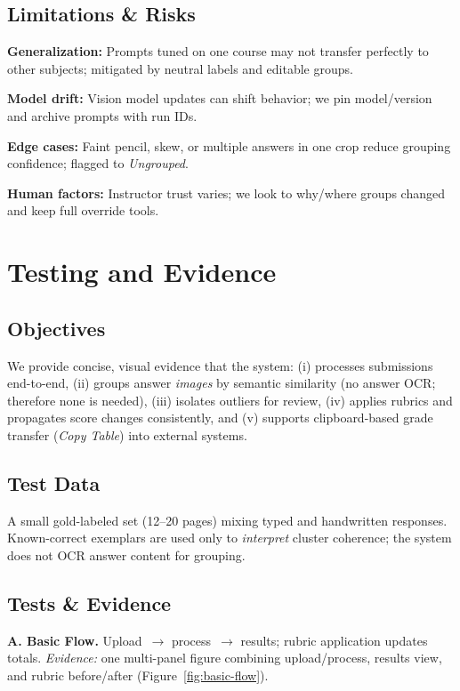 \documentclass[ms,twoside,print]{nuthesis}
\begin{document}
\section{Limitations \& Risks}
\begin{compactitem}
  \item \textbf{Generalization:} Prompts tuned on one course may not transfer perfectly to other subjects; mitigated by neutral labels and editable groups.
  \item \textbf{Model drift:} Vision model updates can shift behavior; we pin model/version and archive prompts with run IDs.
  \item \textbf{Edge cases:} Faint pencil, skew, or multiple answers in one crop reduce grouping confidence; flagged to \emph{Ungrouped}.
  \item \textbf{Human factors:} Instructor trust varies; we look to why/where groups changed and keep full override tools.
\end{compactitem}

\chapter{Testing and Evidence}\label{chap:evalplan}

\section{Objectives}
We provide concise, visual evidence that the system:
(i) processes submissions end-to-end,
(ii) groups answer \emph{images} by semantic similarity (no answer OCR; therefore none is needed),
(iii) isolates outliers for review,
(iv) applies rubrics and propagates score changes consistently, and
(v) supports clipboard-based grade transfer (\emph{Copy Table}) into external systems.

\section{Test Data}
A small gold-labeled set (12–20 pages) mixing typed and handwritten responses. Known-correct exemplars are used only to \emph{interpret} cluster coherence; the system does not OCR answer content for grouping.

\section{Tests \& Evidence}
\textbf{A. Basic Flow.} Upload~$\rightarrow$ process~$\rightarrow$ results; rubric application updates totals.  
\emph{Evidence:} one multi-panel figure combining upload/process, results view, and rubric before/after (Figure~\ref{fig:basic-flow}).
\end{document}
